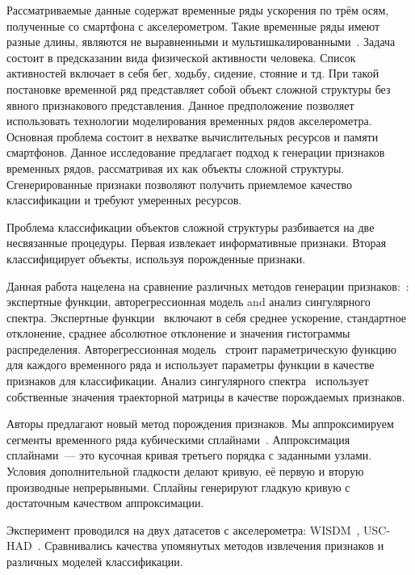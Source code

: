 \documentclass{llncs}
\begin{document}
Рассматриваемые данные содержат временные ряды ускорения по трём осям, полученные со смартфона с акселерометром.
Такие временные ряды имеют разные длины, являются не выравненными и мультишкалированными~\cite{geurts2001pattern}.
Задача состоит в предсказании вида физической активности человека.
Список активностей включает в себя бег, ходьбу, сидение, стояние и тд.
При такой постановке временной ряд представляет собой объект сложной структуры без явного признакового представления.
Данное предположение позволяет использовать технологии моделирования временных рядов акселерометра.
Основная проблема состоит в нехватке вычислительных ресурсов и памяти смартфонов.
Данное исследование предлагает подход к генерации признаков временных рядов, рассматривая их как объекты сложной структуры.
Сгенерированные признаки позволяют получить приемлемое качество классификации и требуют умеренных ресурсов.

Проблема классификации объектов сложной структуры разбивается на две несвязанные процедуры.
Первая извлекает информативные признаки. 
Вторая классифицирует объекты, используя порожденные признаки.

Данная работа нацелена на сравнение различных методов генерации признаков:~\cite{karasikov2016feature,ivkin2015ts}: экспертные функции, авторегрессионная модель and анализ сингулярного спектра.
Экспертные функции~\cite{kwapisz2011activity} включают в себя среднее ускорение, стандартное отклонение, сраднее абсолютное отклонение и значения гистограммы распределения. 
Авторегрессионная модель~\cite{lukashin2003adaptive} строит параметрическую функцию для каждого временного ряда и использует параметры функции в качестве признаков для классификации. 
Анализ сингулярного спектра~\cite{hassani2007singular} использует собственные значения траекторной матрицы в качестве порождаемых признаков.

Авторы предлагают новый метод порождения признаков.
Мы аппроксимируем сегменты временного ряда кубическими сплайнами~\cite{deboor1978splines}. 
Аппроксимация сплайнами~--- это кусочная кривая третьего порядка с заданными узлами.
Условия дополнительной гладкости делают кривую, её первую и вторую производные непрерывными.
Сплайны генерируют гладкую кривую с достаточным качеством аппроксимации.

Эксперимент проводился на двух датасетов с акселерометра: WISDM~\cite{wisdm}, USC-HAD~\cite{usc}. 
Сравнивались качества упомянутых методов извлечения признаков и различных моделей классификации.
\end{document}
